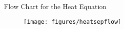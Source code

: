 \documentclass[12pt]{article}
\begin{document}
\pagestyle{empty}


\begin{center}
{\large  Flow Chart for the Heat Equation}
\end{center}
\vspace{1cm}


\begin{figure}[h]
  \centering
  \texttt{[image: figures/heatsepflow]}
\end{figure}

 
\end{document}
